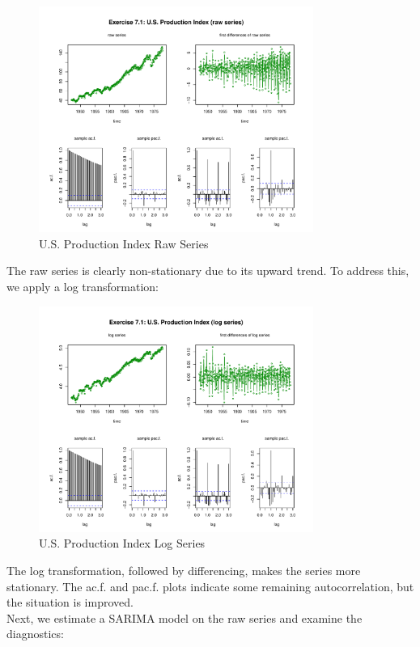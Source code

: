 \begin{figure}[H]
\centering
\includegraphics[width=0.8\textwidth]{plots/UsProdRaw.pdf}
\caption{U.S. Production Index Raw Series}
\end{figure}
The raw series is clearly non-stationary due to its upward trend. To address this, we apply a log transformation:

\begin{figure}[H]
\centering
\includegraphics[width=0.8\textwidth]{plots/UsProdRawLog.pdf}
\caption{U.S. Production Index Log Series}
\end{figure}

The log transformation, followed by differencing, makes the series more stationary. The ac.f. and pac.f. plots indicate some remaining autocorrelation, but the situation is improved.\\

Next, we estimate a SARIMA model on the raw series and examine the diagnostics: \\


